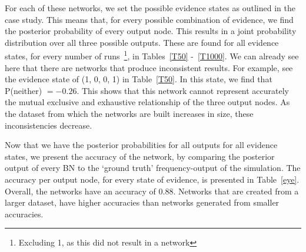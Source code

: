 \documentclass[12pt]{article}
\begin{document}
For each of these networks, we set the possible evidence states as outlined in the case study. This means that, for every possible combination of evidence, we find the posterior probability of every output node. This results in a joint probability distribution over all three possible outputs. These are found for all evidence states, for every number of runs~\footnote{Excluding 1, as this did not result in a network}, in Tables~\ref{T50} -~\ref{T1000}. We can already see here that there are networks that produce inconsistent results. For example, see the evidence state of (1, 0, 0, 1) in Table~\ref{T50}. In this state, we find that P(neither) $= -0.26$. This shows that this network cannot represent accurately the mutual exclusive and exhaustive relationship of the three output nodes. As the dataset from which the networks are built increases in size, these inconsistencies decrease.



Now that we have the posterior probabilities for all outputs for all evidence states, we present the accuracy of the network, by comparing the posterior output of every BN to the `ground truth' frequency-output of the simulation. The accuracy per output node, for every state of evidence, is presented in Table~\ref{eye}. Overall, the networks have an accuracy of 0.88. Networks that are created from a larger dataset, have higher accuracies than networks generated from smaller accuracies.
\end{document}
